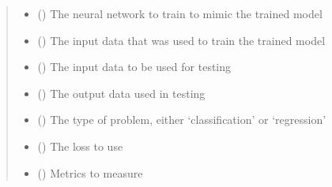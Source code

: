\documentclass[letterpaper,10pt,english]{sphinxmanual}
\begin{document}
\begin{fulllineitems}
\begin{quote}
\begin{description}
\begin{itemize}
\item {} 
\sphinxAtStartPar
{} () \textendash{} The neural network to train to mimic the trained model

\item {} 
\sphinxAtStartPar
{} () \textendash{} The input data that was used to train the trained model

\item {} 
\sphinxAtStartPar
{} () \textendash{} The input data to be used for testing

\item {} 
\sphinxAtStartPar
{} () \textendash{} The output data used in testing

\item {} 
\sphinxAtStartPar
{} () \textendash{} The type of problem, either ‘classification’ or ‘regression’

\item {} 
\sphinxAtStartPar
{} () \textendash{} The loss to use

\item {} 
\sphinxAtStartPar
{} (\sphinxstyleliteralemphasis{\sphinxupquote{, }}\sphinxstyleliteralemphasis{\sphinxupquote{, }}) \textendash{} Metrics to measure


\end{itemize}
\end{description}
\end{quote}
\end{fulllineitems}
\end{document}
